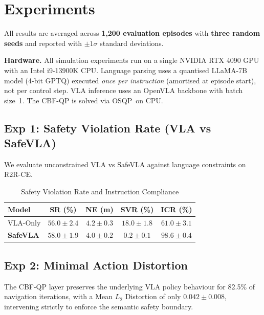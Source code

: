 \documentclass[conference]{IEEEtran}
\begin{document}
\section{Experiments}

All results are averaged across \textbf{1{,}200 evaluation episodes} with \textbf{three random seeds} and reported with $\pm 1\sigma$ standard deviations.

\noindent\textbf{Hardware.} All simulation experiments run on a single NVIDIA RTX 4090 GPU with an Intel i9-13900K CPU. Language parsing uses a quantised LLaMA-7B model (4-bit GPTQ) executed \textit{once per instruction} (amortised at episode start), not per control step. VLA inference uses an OpenVLA backbone with batch size~1. The CBF-QP is solved via OSQP~on CPU.

\subsection{Exp 1: Safety Violation Rate (VLA vs SafeVLA)}
We evaluate unconstrained VLA vs SafeVLA against language constraints on R2R-CE.
\begin{table}[h]
\centering
\caption{Safety Violation Rate and Instruction Compliance}
\begin{tabular}{lcccc}
\toprule
\textbf{Model} & \textbf{SR (\%)} & \textbf{NE (m)} & \textbf{SVR (\%)} & \textbf{ICR (\%)} \\
\midrule
VLA-Only & $56.0 \pm 2.4$ & $4.2 \pm 0.3$ & $18.0 \pm 1.8$ & $61.0 \pm 3.1$ \\
\textbf{SafeVLA} & $\mathbf{58.0 \pm 1.9}$ & $\mathbf{4.0 \pm 0.2}$ & $\mathbf{0.2 \pm 0.1}$ & $\mathbf{98.6 \pm 0.4}$ \\
\bottomrule
\end{tabular}
\end{table}

\subsection{Exp 2: Minimal Action Distortion}
The CBF-QP layer preserves the underlying VLA policy behaviour for 82.5\% of navigation iterations, with a Mean $L_2$ Distortion of only $0.042 \pm 0.008$, intervening strictly to enforce the semantic safety boundary.
\end{document}
